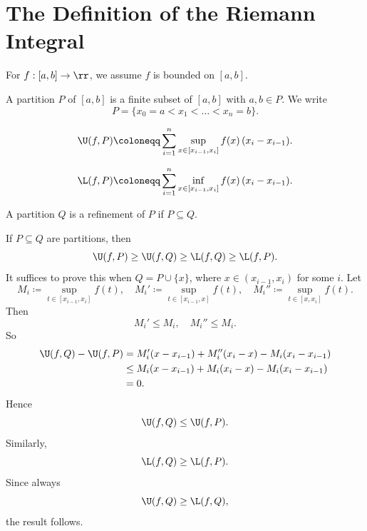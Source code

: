 
\section{The Definition of the Riemann Integral}


\begin{remark}
    For $f:[a,b]\to\rr$, we assume $f$ is bounded on $[a,b]$.
\end{remark}

\begin{definition}[Partition]
    A partition $P$ of $[a,b]$ is a finite subset of $[a,b]$ with $a,b\in P$.
    We write
    \[
        P = \{x_0 = a < x_1 < \ldots < x_n = b\}.
    \]
\end{definition}

\begin{definition}
    \[
        \U(f, P)\coloneqq\sum_{i=1}^n \sup_{x\in[x_{i-1},x_i]} f(x)\,(x_i - x_{i-1}).
    \]
\end{definition}

\begin{definition}
    \[
        \L(f, P)\coloneqq\sum_{i=1}^n \inf_{x\in[x_{i-1},x_i]} f(x)\,(x_i - x_{i-1}).
    \]
\end{definition}

\begin{definition}[Refinement]
    A partition $Q$ is a refinement of $P$ if $P\subseteq Q$.
\end{definition}

\begin{lemma}{
    If $P\subseteq Q$ are partitions, then
    \[
        \U(f,P)\geq \U(f,Q)\geq\L(f,Q)\geq\L(f,P).
    \]
}
    It suffices to prove this when $Q = P\cup\{x\}$, where $x\in(x_{i-1},x_i)$ for some $i$.
    Let
    \[
        M_i \coloneqq \sup_{t\in[x_{i-1},x_i]} f(t), \quad
        M_i' \coloneqq \sup_{t\in[x_{i-1},x]} f(t), \quad
        M_i'' \coloneqq \sup_{t\in[x,x_i]} f(t).
    \]
    Then
    \[
        M_i'\leq M_i, \quad M_i''\leq M_i.
    \]
    So
    \begin{align*}
        \U(f,Q) - \U(f,P)
        &= M_i'(x-x_{i-1}) + M_i''(x_i-x) - M_i(x_i-x_{i-1})\\
        &\leq M_i(x-x_{i-1}) + M_i(x_i-x) - M_i(x_i-x_{i-1})\\
        &= 0.
    \end{align*}
    Hence
    \[
        \U(f,Q)\leq \U(f,P).
    \]
    Similarly,
    \[
        \L(f,Q)\geq \L(f,P).
    \]
    Since always
    \[
        \U(f,Q)\geq \L(f,Q),
    \]
    the result follows.
\end{lemma}

